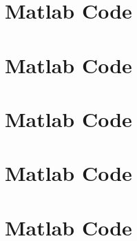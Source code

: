 \documentclass[a4paper,12pt]{article}
\begin{document}
\section*{Matlab Code} 
\newpage
\section*{Matlab Code} 
\newpage
\section*{Matlab Code} 
\newpage
\section*{Matlab Code} 
\newpage
\section*{Matlab Code} 
\end{document}

